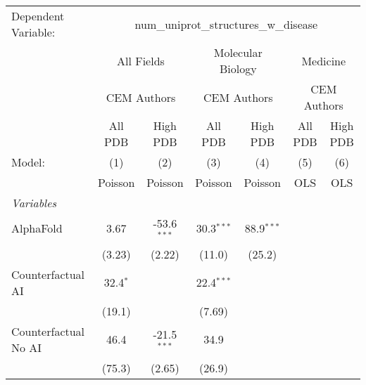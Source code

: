 \begingroup
\centering
\begin{tabular}{lcccccc}
   \tabularnewline \midrule \midrule
   Dependent Variable: & \multicolumn{6}{c}{num\_uniprot\_structures\_w\_disease}\\
 & \multicolumn{2}{c}{All Fields} & \multicolumn{2}{c}{Molecular Biology} & \multicolumn{2}{c}{Medicine} \\
\cmidrule(lr){2-3} \cmidrule(lr){4-5} \cmidrule(lr){6-7}
 & \multicolumn{2}{c}{CEM Authors} & \multicolumn{2}{c}{CEM Authors} & \multicolumn{2}{c}{CEM Authors} \\
\cmidrule(lr){2-3} \cmidrule(lr){4-5} \cmidrule(lr){6-7}
 & \multicolumn{1}{c}{All PDB} & \multicolumn{1}{c}{High PDB} & \multicolumn{1}{c}{All PDB} & \multicolumn{1}{c}{High PDB} & \multicolumn{1}{c}{All PDB} & \multicolumn{1}{c}{High PDB} \\
\cmidrule(lr){2-2} \cmidrule(lr){3-3} \cmidrule(lr){4-4} \cmidrule(lr){5-5} \cmidrule(lr){6-6} \cmidrule(lr){7-7}
   Model:                                                     & (1)          & (2)                   & (3)           & (4)            & (5)  & (6)\\  
                                                              &  Poisson     & Poisson               & Poisson       & Poisson        & OLS  & OLS\\  
   \midrule
   \emph{Variables}\\
   AlphaFold                                                  & 3.67         & -53.6$^{***}$         & 30.3$^{***}$  & 88.9$^{***}$   &      &   \\   
                                                              & (3.23)       & (2.22)                & (11.0)        & (25.2)         &      &   \\   
   Counterfactual AI                                          & 32.4$^{*}$   &                       & 22.4$^{***}$  &                &      &   \\   
                                                              & (19.1)       &                       & (7.69)        &                &      &   \\   
   Counterfactual No AI                                       & 46.4         & -21.5$^{***}$         & 34.9          &                &      &   \\   
                                                              & (75.3)       & (2.65)                & (26.9)        &                &      &   \\   

\end{tabular}
